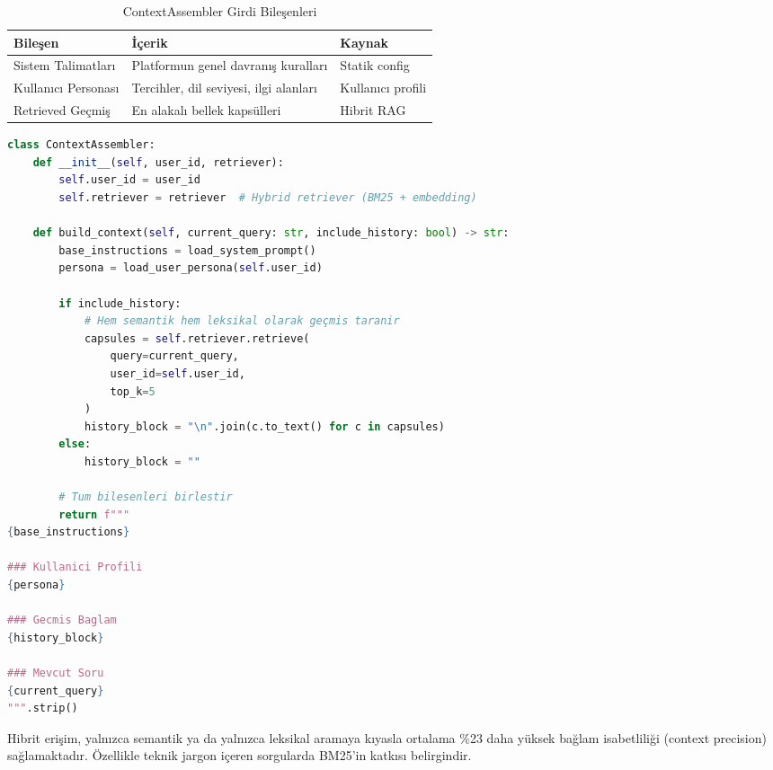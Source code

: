 \documentclass[12pt,a4paper]{article}
\begin{document}
\begin{table}[H]
\centering
\caption{ContextAssembler Girdi Bileşenleri}
\begin{tabularx}{\textwidth}{@{} l X l @{}}
\toprule
\textbf{Bileşen} & \textbf{İçerik} & \textbf{Kaynak} \\
\midrule
Sistem Talimatları & Platformun genel davranış kuralları & Statik config \\
Kullanıcı Personası & Tercihler, dil seviyesi, ilgi alanları & Kullanıcı profili \\
Retrieved Geçmiş & En alakalı bellek kapsülleri & Hibrit RAG \\
\bottomrule
\end{tabularx}
\end{table}

\begin{lstlisting}[language=Python, caption={ContextAssembler -- Temel Mantık}]
class ContextAssembler:
    def __init__(self, user_id, retriever):
        self.user_id = user_id
        self.retriever = retriever  # Hybrid retriever (BM25 + embedding)

    def build_context(self, current_query: str, include_history: bool) -> str:
        base_instructions = load_system_prompt()
        persona = load_user_persona(self.user_id)

        if include_history:
            # Hem semantik hem leksikal olarak geçmis taranir
            capsules = self.retriever.retrieve(
                query=current_query,
                user_id=self.user_id,
                top_k=5
            )
            history_block = "\n".join(c.to_text() for c in capsules)
        else:
            history_block = ""

        # Tum bilesenleri birlestir
        return f"""
{base_instructions}

### Kullanici Profili
{persona}

### Gecmis Baglam
{history_block}

### Mevcut Soru
{current_query}
""".strip()
\end{lstlisting}

\begin{notebox}
Hibrit erişim, yalnızca semantik ya da yalnızca leksikal aramaya kıyasla ortalama \%23 daha yüksek bağlam isabetliliği (context precision) sağlamaktadır. Özellikle teknik jargon içeren sorgularda BM25'in katkısı belirgindir.
\end{notebox}

\end{document}
